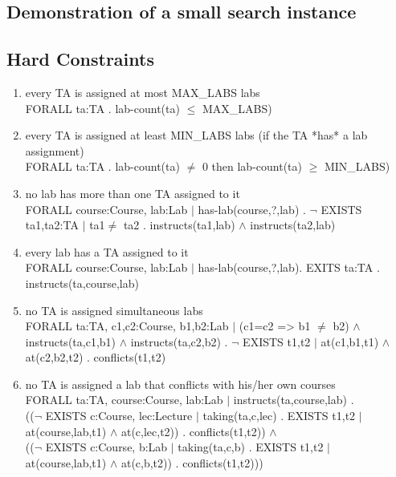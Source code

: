 \documentclass{article}
\begin{document}
\subsection{Demonstration of a small search instance}

\pagebreak
\begin{appendices}

  \section{Hard Constraints}
\label{hard}
  \begin{enumerate}
    
  \item every TA is assigned at most MAX\_LABS labs\\ FORALL ta:TA .
    lab-count(ta) $\leq$ MAX\_LABS)\\

  \item every TA is assigned at least MIN\_LABS labs (if the TA *has* a
    lab assignment)\\ FORALL ta:TA . lab-count(ta) $\not=$ 0 then
    lab-count(ta) $\geq$ MIN\_LABS)\\

  \item  no lab has more than one TA assigned to it\\ FORALL
    course:Course, lab:Lab $|$ has-lab(course,?,lab) . $\lnot$ EXISTS
    ta1,ta2:TA $|$ ta1$\not=$ ta2 . instructs(ta1,lab) $\land$
    instructs(ta2,lab)\\

  \item every lab has a TA assigned to it\\ FORALL course:Course, lab:Lab
    $|$ has-lab(course,?,lab). EXITS ta:TA . instructs(ta,course,lab)\\

  \item no TA is assigned simultaneous labs\\ FORALL ta:TA, c1,c2:Course,
    b1,b2:Lab $|$ (c1=c2 => b1 $\not=$ b2) $\land$ instructs(ta,c1,b1)
    $\land$ instructs(ta,c2,b2) . $\lnot$ EXISTS t1,t2 $|$ at(c1,b1,t1)
    $\land$ at(c2,b2,t2) . conflicts(t1,t2)\\

  \item no TA is assigned a lab that conflicts with his/her own
    courses\\ FORALL ta:TA, course:Course, lab:Lab $|$
    instructs(ta,course,lab) .\\ (($\lnot$ EXISTS c:Course, lec:Lecture
    $|$ taking(ta,c,lec) . EXISTS t1,t2 $|$ at(course,lab,t1) $\land$
    at(c,lec,t2)) . conflicts(t1,t2)) $\land$\\ (($\lnot$ EXISTS
    c:Course, b:Lab $|$ taking(ta,c,b) . EXISTS t1,t2 $|$
    at(course,lab,t1) $\land$ at(c,b,t2)) . conflicts(t1,t2)))\\


\end{enumerate}
\end{appendices}
\end{document}
